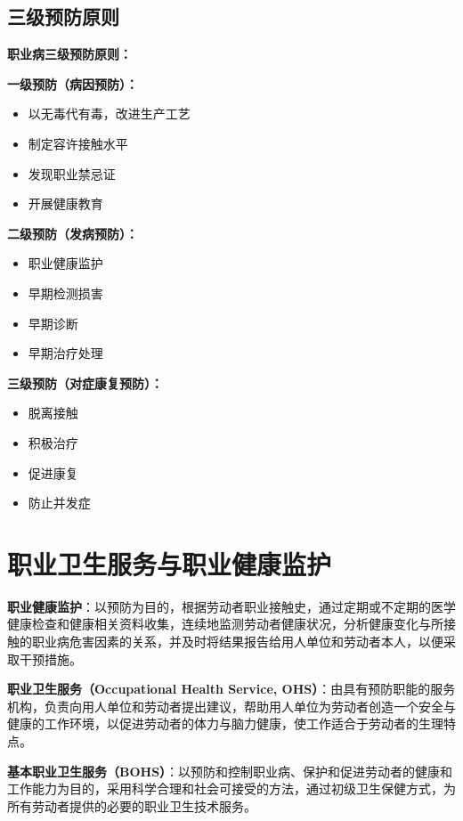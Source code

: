 \subsection{三级预防原则}

\begin{keybox}
\textbf{职业病三级预防原则：}

\textbf{一级预防（病因预防）：}
\begin{itemize}[leftmargin=*]
    \item 以无毒代有毒，改进生产工艺
    \item 制定容许接触水平
    \item 发现职业禁忌证
    \item 开展健康教育
\end{itemize}

\textbf{二级预防（发病预防）：}
\begin{itemize}[leftmargin=*]
    \item 职业健康监护
    \item 早期检测损害
    \item 早期诊断
    \item 早期治疗处理
\end{itemize}

\textbf{三级预防（对症康复预防）：}
\begin{itemize}[leftmargin=*]
    \item 脱离接触
    \item 积极治疗
    \item 促进康复
    \item 防止并发症
\end{itemize}
\end{keybox}

\section{职业卫生服务与职业健康监护}

\begin{defbox}
\textbf{职业健康监护}：以预防为目的，根据劳动者职业接触史，通过定期或不定期的医学健康检查和健康相关资料收集，连续地监测劳动者健康状况，分析健康变化与所接触的职业病危害因素的关系，并及时将结果报告给用人单位和劳动者本人，以便采取干预措施。

\textbf{职业卫生服务（Occupational Health Service, OHS）}：由具有预防职能的服务机构，负责向用人单位和劳动者提出建议，帮助用人单位为劳动者创造一个安全与健康的工作环境，以促进劳动者的体力与脑力健康，使工作适合于劳动者的生理特点。

\textbf{基本职业卫生服务（BOHS）}：以预防和控制职业病、保护和促进劳动者的健康和工作能力为目的，采用科学合理和社会可接受的方法，通过初级卫生保健方式，为所有劳动者提供的必要的职业卫生技术服务。
\end{defbox}

